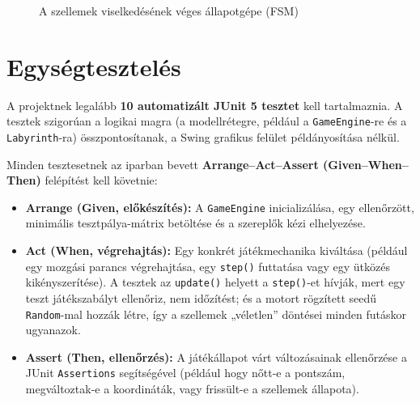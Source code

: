 \documentclass[11pt, a4paper]{article}
\begin{document}
\begin{figure}[h!]
    \centering
    \caption{A szellemek viselkedésének véges állapotgépe (FSM)}
    \label{fig:ghost_fsm}
\end{figure}

\clearpage

\section{Egységtesztelés}
A projektnek legalább \textbf{10 automatizált JUnit 5 tesztet} kell tartalmaznia. A tesztek szigorúan a logikai magra (a modellrétegre, például a \texttt{GameEngine}-re és a \texttt{Labyrinth}-ra) összpontosítanak, a Swing grafikus felület példányosítása nélkül.

Minden tesztesetnek az iparban bevett \textbf{Arrange–Act–Assert (Given–When–Then)} felépítést kell követnie:
\begin{itemize}
    \item \textbf{Arrange (Given, előkészítés):} A \texttt{GameEngine} inicializálása, egy ellenőrzött, minimális tesztpálya-mátrix betöltése és a szereplők kézi elhelyezése.
    \item \textbf{Act (When, végrehajtás):} Egy konkrét játékmechanika kiváltása (például egy mozgási parancs végrehajtása, egy \texttt{step()} futtatása vagy egy ütközés kikényszerítése). A tesztek az \texttt{update()} helyett a \texttt{step()}-et hívják, mert egy teszt játékszabályt ellenőriz, nem időzítést; és a motort rögzített seedű \texttt{Random}-mal hozzák létre, így a szellemek „véletlen” döntései minden futáskor ugyanazok.
    \item \textbf{Assert (Then, ellenőrzés):} A játékállapot várt változásainak ellenőrzése a JUnit \texttt{Assertions} segítségével (például hogy nőtt-e a pontszám, megváltoztak-e a koordináták, vagy frissült-e a szellemek állapota).
\end{itemize}
\end{document}
